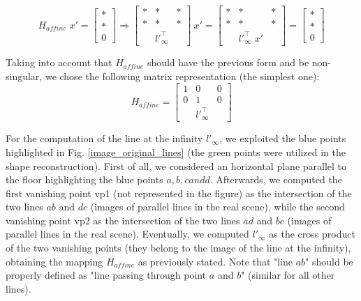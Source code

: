\documentclass[11pt, oneside]{article}
\begin{document}
\begin{equation}
	H_{affine} \; x' = 
	\begin{bmatrix}
		* \\ * \\ 0
	\end{bmatrix}
	\Rightarrow
	\begin{bmatrix}
		* & * & * \\ * & * & * \\ & {l'}^{\intercal}_{\infty} &
	\end{bmatrix}
	\: x' =
	\begin{bmatrix}
		* & * & * \\ * & * & * \\ & {l'}^{\intercal}_{\infty} \; x' &
	\end{bmatrix}
	=
	\begin{bmatrix}
		* \\ * \\ 0
	\end{bmatrix}
\end{equation}

Taking into account that $H_{affine}$ should have the previous form and be non-singular, we chose the following matrix representation (the simplest one):
\begin{equation}
	H_{affine} =
	\begin{bmatrix}
		1 & 0 & 0 \\ 0 & 1 & 0 \\ & {l'}^{\intercal}_{\infty} &
	\end{bmatrix}
\end{equation}

For the computation of the line at the infinity $l'_{\infty}$, we exploited the blue points highlighted in Fig. \ref{image_original_lines} (the green points were utilized in the shape reconstruction). First of all, we considered an horizontal plane parallel to the floor highlighting the blue points $a, b, c and d$. Afterwards, we computed the first vanishing point vp1 (not represented in the figure) as the intersection of the two lines $ab$ and $dc$ (images of parallel lines in the real scene), while the second vanishing point vp2 as the intersection of the two lines $ad$ and $bc$ (images of parallel lines in the real scene). Eventually, we computed $l'_{\infty}$ as the cross product of the two vanishing points (they belong to the image of the line at the infinity), obtaining the mapping $H_{affine}$ as previously stated. Note that "line $ab$" should be properly defined as "line passing through point $a$ and $b$" (similar for all other lines).
\end{document}
